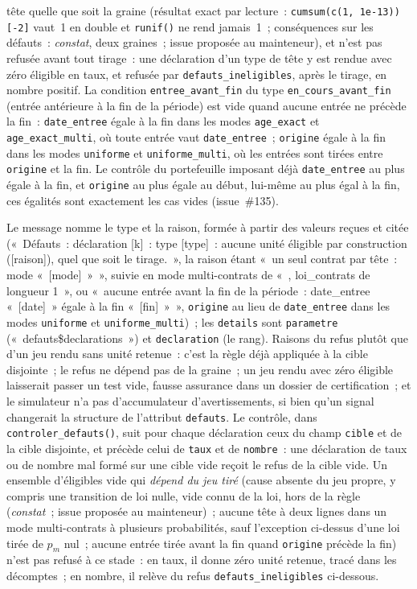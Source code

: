 \documentclass[a4paper,11pt]{article}
\newcommand{\code}[1]{\texttt{\small #1}}
\begin{document}
\begin{itemize}[leftmargin=*, itemsep=2pt]
    tête quelle que soit la graine (résultat exact par lecture~:
    \code{cumsum(c(1, 1e-13))[-2]} vaut~1 en double et \code{runif()} ne
    rend jamais~1~; conséquences sur les défauts~: \emph{constat}, deux
    graines~; issue proposée au mainteneur), et n'est pas refusée avant
    tout tirage~: une déclaration d'un type de tête y est rendue avec zéro
    éligible en taux, et refusée par \code{defauts\_ineligibles}, après le
    tirage, en nombre positif. La condition
    \code{entree\_avant\_fin} du type \code{en\_cours\_avant\_fin}
    (entrée antérieure à la fin de la période) est vide quand aucune
    entrée ne précède la fin~: \code{date\_entree} égale à la fin dans les
    modes \code{age\_exact} et \code{age\_exact\_multi}, où toute entrée
    vaut \code{date\_entree}~; \code{origine} égale à la fin dans les modes
    \code{uniforme} et \code{uniforme\_multi}, où les entrées sont tirées
    entre \code{origine} et la fin. Le contrôle du portefeuille imposant
    déjà \code{date\_entree} au plus égale à la fin, et \code{origine} au
    plus égale au début, lui-même au plus égal à la fin, ces égalités sont
    exactement les cas vides (issue~\#135).
\end{itemize}
Le message nomme le type et la raison, formée à partir des valeurs
reçues et citée («~Défauts~: déclaration [k]~: type [type]~: aucune
unité éligible par construction ([raison]), quel que soit le tirage.~»,
la raison étant «~un seul contrat par tête~: mode «~[mode]~»~», suivie en
mode multi-contrats de «~, loi\_contrats de longueur 1~», ou «~aucune
entrée avant la fin de la période~: date\_entree «~[date]~» égale à la fin
«~[fin]~»~», \code{origine} au lieu de \code{date\_entree} dans les modes
\code{uniforme} et \code{uniforme\_multi})~; les \code{details} sont \code{parametre}
(«~defauts\$declarations~») et \code{declaration} (le rang). Raisons du
refus plutôt que d'un jeu rendu sans unité retenue~: c'est la règle déjà
appliquée à la cible disjointe~; le refus ne dépend pas de la graine~; un
jeu rendu avec zéro éligible laisserait passer un test vide, fausse
assurance dans un dossier de certification~; et le simulateur n'a pas
d'accumulateur d'avertissements, si bien qu'un signal changerait la
structure de l'attribut \code{defauts}. Le contrôle, dans
\code{controler\_defauts()}, suit pour chaque déclaration ceux du champ
\code{cible} et de la cible disjointe, et précède celui de \code{taux} et
de \code{nombre}~: une déclaration de taux ou de nombre mal formé sur une
cible vide reçoit le refus de la cible vide. Un ensemble d'éligibles vide
qui \emph{dépend du jeu tiré} (cause absente du jeu propre, y compris une
transition de loi nulle, vide connu de la loi, hors de la règle
(\emph{constat}~; issue proposée au mainteneur)~; aucune tête à deux lignes
dans un mode multi-contrats à plusieurs probabilités, sauf l'exception
ci-dessus d'une loi tirée de $p_m$ nul~; aucune entrée tirée avant la fin
quand \code{origine} précède la fin) n'est pas refusé à ce stade~: en taux, il donne zéro unité retenue, tracé dans les
décomptes~; en nombre, il relève du refus \code{defauts\_ineligibles}
ci-dessous.
\end{document}
